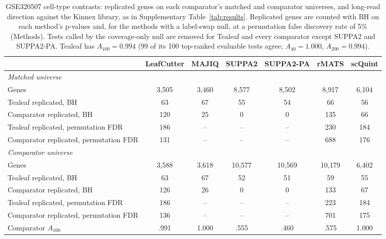 \documentclass[11pt]{article}
\begin{document}
\begin{table}[ht]
\centering
\small
\setlength{\tabcolsep}{4pt}
\begin{tabular}{lcccccc}
\toprule
 & LeafCutter & MAJIQ & SUPPA2 & SUPPA2-PA & rMATS & scQuint\\
\midrule
\multicolumn{7}{l}{\emph{Matched universe}}\\
Genes & 3{,}505 & 3{,}460 & 8{,}577 & 8{,}502 & 8{,}917 & 6{,}104\\
Tealeaf replicated, BH & 63 & 67 & 55 & 54 & 66 & 56\\
Comparator replicated, BH & 120 & 25 & 0 & 0 & 135 & 66\\
Tealeaf replicated, permutation FDR & 186 & -- & -- & -- & 230 & 184\\
Comparator replicated, permutation FDR & 131 & -- & -- & -- & 688 & 176\\
\midrule
\multicolumn{7}{l}{\emph{Comparator universe}}\\
Genes & 3{,}588 & 3{,}618 & 10{,}577 & 10{,}569 & 10{,}179 & 6{,}402\\
Tealeaf replicated, BH & 63 & 67 & 52 & 51 & 59 & 55\\
Comparator replicated, BH & 126 & 26 & 0 & 0 & 133 & 67\\
Tealeaf replicated, permutation FDR & 186 & -- & -- & -- & 223 & 184\\
Comparator replicated, permutation FDR & 136 & -- & -- & -- & 701 & 175\\
\midrule
Comparator $A_{100}$ & .991 & 1.000 & .555 & .460 & .575 & 1.000\\
\bottomrule
\end{tabular}
\caption{GSE320507 cell-type contrasts: replicated genes on each comparator's matched and comparator universes, and long-read direction against the Kinnex library, as in Supplementary Table~\ref{tab:results}. Replicated genes are counted with BH on each method's p-values and, for the methods with a label-swap null, at a permutation false discovery rate of 5\% (Methods). Tests called by the coverage-only null are removed for Tealeaf and every comparator except SUPPA2 and SUPPA2-PA. Tealeaf has $A_{100}=0.994$ (99 of its 100 top-ranked evaluable tests agree; $A_{40}=1.000$, $A_{200}=0.994$).}
\label{tab:pbmc-results}
\end{table}
\end{document}
